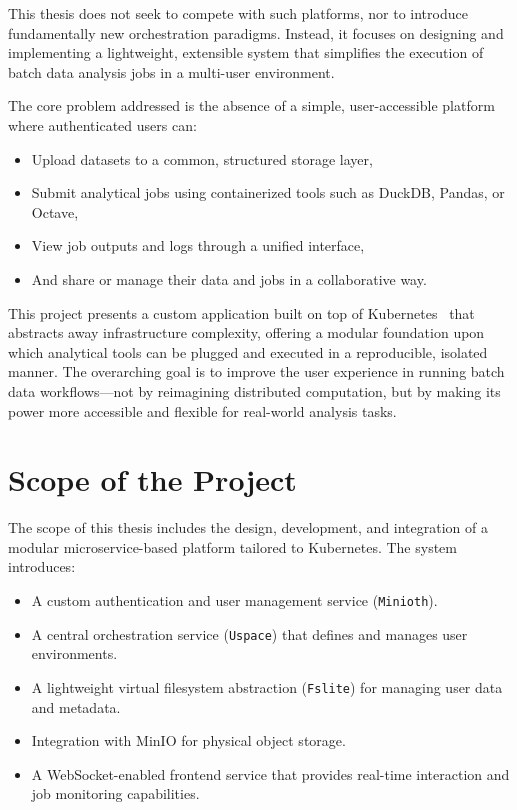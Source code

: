 This thesis does not seek to compete with such platforms, nor to introduce fundamentally new orchestration paradigms. 
Instead, it focuses on designing and implementing a lightweight, extensible system that simplifies the execution of batch 
data analysis jobs in a multi-user environment.

The core problem addressed is the absence of a simple, user-accessible platform where authenticated users can:
\begin{itemize}
    \item Upload datasets to a common, structured storage layer,
    \item Submit analytical jobs using containerized tools such as DuckDB, Pandas, or Octave,
    \item View job outputs and logs through a unified interface,
    \item And share or manage their data and jobs in a collaborative way.
\end{itemize}

This project presents a custom application built on top of Kubernetes~\cite{google-kubernetes} that abstracts away infrastructure complexity, 
offering a modular foundation upon which analytical tools can be plugged and executed in a reproducible, isolated manner. 
The overarching goal is to improve the user experience in running batch data workflows—not by reimagining distributed computation, 
but by making its power more accessible and flexible for real-world analysis tasks.



\section{Scope of the Project}
\hspace{2mm}The scope of this thesis includes the design, development, and integration of a modular microservice-based platform tailored to Kubernetes. 
The system introduces:

\begin{itemize}
    \item A custom authentication and user management service (\texttt{Minioth}).
    \item A central orchestration service (\texttt{Uspace}) that defines and manages user environments.
    \item A lightweight virtual filesystem abstraction (\texttt{Fslite}) for managing user data and metadata.
    \item Integration with MinIO for physical object storage.
    \item A WebSocket-enabled frontend service that provides real-time interaction and job monitoring capabilities.
\end{itemize}

